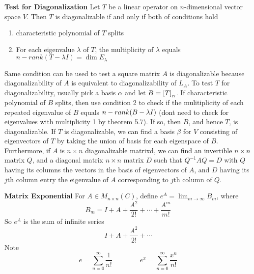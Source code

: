 \documentclass[11pt]{article}
\begin{document}
\begin{defn*}
    \textbf{Test for Diagonalization} Let $T$ be a linear operator on $n$-dimensional vector space $V$. Then $T$ is diagonalizable if and only if both of conditions hold 
    \begin{enumerate}
        \item characteristic polynomial of $T$ splits 
        \item For each eigenvalue $\lambda$ of $T$, the multiplicity of $\lambda$ equals $n-rank(T-\lambda I) = \dim{E_{\lambda}}$
    \end{enumerate}
    Same condition can be used to test a square matrix $A$ is diagonalizable because diagonalizability of $A$ is equivalent to diagonalizability of $L_A$. To test $T$ for diagonalizability, usually pick a basis $\alpha$ and let $B=\left[ T \right]_{\alpha}$. If characteristic polynomial of $B$ splits, then use condition 2 to check if the mulitiplicity of each repeated eigenvalue of $B$ equals $n-rank(B-\lambda I)$ (dont need to check for eigenvalues with multiplicity 1 by theorem 5.7). If so, then $B$, and hence $T$, is diagonalizable. If $T$ is diagonalizable, we can find a basis $\beta$ for $V$ consisting of eigenvectors of $T$ by taking the union of basis for each eigenspace of $B$. Furthermore, if $A$ is $n\times n$ diagonalizable matrixd, we can find an invertible $n\times n$ matrix $Q$, and a diagonal matrix $n\times n$ matrix $D$ such that $Q^{-1}AQ=D$ with $Q$ having its columns the vectors in the basis of eigenvectors of $A$, and $D$ having its $j$th column entry the eigenvalue of $A$ corresponding to $j$th column of $Q$.
\end{defn*}




\begin{defn*}
    \textbf{Matrix Exponential} For $A\in M_{n\times n}(C)$, define $e^A = \lim_{m\to \infty} B_m$, where 
    \[
        B_m = I + A + \frac{A^2}{2!} + \cdots + \frac{A^m}{m!}    
    \]
    So $e^A$ is the sum of infinite series 
    \[
        I+A+ \frac{A^2}{2!} + \cdots   
    \]
    Note 
    \[
        e = \sum_{n=0}^{\infty} \frac{1}{n!}    
        \quad \quad \quad \quad 
        e^x = \sum_{n=0}^{\infty} \frac{x^n}{n!}
    \]
\end{defn*}



\end{document}
